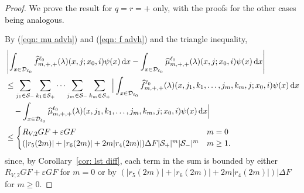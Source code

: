 \begin{proof}
	We prove the result for \(q=r=+\) only, with the proofs for the other cases being analogous. 
	
	By (\ref{eqn: mu advh}) and (\ref{eqn: f advh}) and the triangle inequality, 
            \begin{align*}
            	&\left| \int_{x\in\mathcal{D}_{\ell_0}} \widehat f^{\ell_0}_{m,+,+}(\lambda)(x,j;x_0,i)\psi(x)\, \mathrm{d} x -  \int_{x\in\mathcal{D}_{\ell_0}} \widehat \mu^{\ell_0}_{m,+,+}(\lambda)(x,j;x_0,i)\psi(x)\, \mathrm{d} x\right|
		\\&\leq \sum_{j_1\in\mathcal S_-} \sum_{k_1\in\mathcal S_+}\dots \sum_{j_m\in\mathcal S_-}\sum_{k_m\in\mathcal S_+} \Big|  \int_{x\in\mathcal{D}_{\ell_0}} \widehat f^{\ell_0}_{m,+,+}(\lambda)( x, j_1,k_1,\dots,j_m,k_m, j; x_0,i) \psi(x)\, \mathrm{d} x
		\\&\quad{}- \int_{x\in\mathcal{D}_{\ell_0}} \widehat \mu^{\ell_0}_{m,+,+}(\lambda)( x, j_1,k_1,\dots,j_m,k_m, j; x_0,i)\psi(x)\, \mathrm{d} x \Big|
		\\&\leq  \begin{cases}
			R_{V,2} GF + \varepsilon GF & m = 0 \\
			(|r_5(2m)| + |r_6(2m)| + 2m|r_4(2m)|)\Delta F |\mathcal{S}_+|^m|\mathcal{S}_-|^m  &  m\geq 1.
			\end{cases}
        \end{align*}
         since, by Corollary~\ref{cor: lst diff}, each term in the sum is bounded by either \(R_{V,2} GF + \varepsilon GF\) for \(m=0\) or by \((|r_5(2m)| + |r_6(2m)| + 2m|r_4(2m)|)|\Delta F \) for \(m\geq 0\). 
\end{proof}

